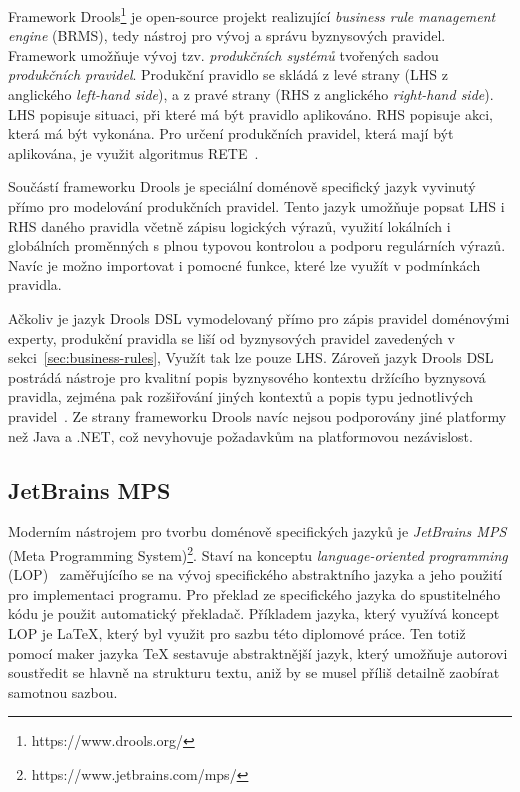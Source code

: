 Framework Drools\footnote{https://www.drools.org/} je open-source projekt realizující
\textit{business rule management engine} (\gls{BRMS}), tedy nástroj pro vývoj a správu byznysových
pravidel. Framework umožňuje vývoj tzv. \textit{produkčních systémů} tvořených sadou \textit{produkčních pravidel}.
Produkční pravidlo se skládá z levé strany (\gls{LHS} z anglického \textit{left-hand side}),
a z pravé strany (\gls{RHS} z anglického \textit{right-hand side}).
\gls{LHS} popisuje situaci, při které má být pravidlo aplikováno. \gls{RHS} popisuje akci,
která má být vykonána. Pro určení produkčních pravidel, která mají být aplikována, je využit
algoritmus RETE~\cite{forgy1988rete}.

Součástí frameworku Drools je speciální doménově specifický jazyk vyvinutý přímo
pro modelování produkčních pravidel. Tento jazyk umožňuje popsat \gls{LHS} i \gls{RHS}
daného pravidla včetně zápisu logických výrazů, využití lokálních i globálních proměnných
s plnou typovou kontrolou a podporu regulárních výrazů. Navíc je možno importovat i pomocné funkce, které lze
využít v podmínkách pravidla.

Ačkoliv je jazyk Drools \gls{DSL} vymodelovaný přímo pro zápis pravidel doménovými experty,
produkční pravidla se liší od byznysových pravidel zavedených v sekci~\ref{sec:business-rules},
Využít tak lze pouze \gls{LHS}. Zároveň jazyk Drools \gls{DSL} postrádá
nástroje pro kvalitní popis byznysového kontextu držícího byznysová pravidla,
zejména pak rozšiřování jiných kontextů a popis typu jednotlivých pravidel~\cite{cemus2017automated}.
Ze strany frameworku Drools navíc nejsou podporovány jiné platformy než Java a .NET, což nevyhovuje
požadavkům na platformovou nezávislost.

\subsection{JetBrains MPS}

Moderním nástrojem pro tvorbu doménově specifických jazyků
je \textit{JetBrains MPS} (Meta Programming System)\footnote{https://www.jetbrains.com/mps/}.
Staví na konceptu \textit{language-oriented programming} (\gls{LOP})~\cite{ward1994language} zaměřujícího
se na vývoj specifického abstraktního jazyka a jeho použití pro implementaci programu. Pro překlad ze specifického
jazyka do spustitelného kódu je použit automatický překladač. Příkladem jazyka, který využívá koncept \gls{LOP}
je \LaTeX\xspace, který byl využit pro sazbu této diplomové práce. Ten totiž pomocí maker jazyka \TeX\xspace
sestavuje abstraktnější jazyk, který umožňuje autorovi soustředit se hlavně na strukturu textu, aniž by
se musel příliš detailně zaobírat samotnou sazbou.

